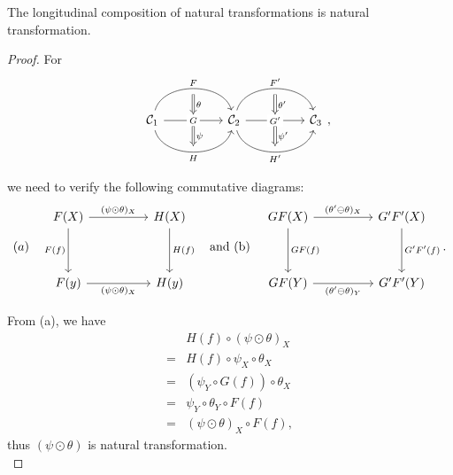 \documentclass{article}
\begin{document}
\begin{thm}
	The longitudinal composition of natural transformations is natural transformation.	
\end{thm}
\begin{proof}
	For
	\[\quad\begin{tikzcd}
		\mathcal{C}_1
		\arrow[bend left=75, rr, "F", ""' name=F] \arrow[rr, "G" description, "" name=G, ""' name=GG] \arrow[bend right=75, rr, "H"', "" name=H] & &
		\arrow[Rightarrow, from=F, to=G, "\theta"] \arrow[Rightarrow, from=GG, to=H, "\psi"]
		\mathcal{C}_2 \arrow[bend left=75, rr, "F'", ""' name=F'] \arrow[rr, "G'" description, "" name=G', ""' name=GG'] \arrow[bend right=75, rr, "H'"', "" name=H'] & &
		\arrow[Rightarrow, from=F', to=G', "\theta'"] \arrow[Rightarrow, from=GG', to=H', "\psi'"] \mathcal{C}_3
	\end{tikzcd},\]
	
	we need to verify the following commutative diagrams:
		\[(a)\quad\begin{tikzcd}
			F(X) \arrow[dd,"F(f)"'] \arrow[rr,"(\psi\odot\theta)_X"] && H(X) \arrow[dd,"H(f)"] \\ && \\
			F(y) \arrow[rr,"(\psi\odot\theta)_X"'] && H(y)
		\end{tikzcd}\quad\text{and (b)}\quad\begin{tikzcd}
			GF(X) \arrow[dd,"GF(f)"] \arrow[rr,"(\theta'\ominus\theta)_X"] && G'F'(X) \arrow[dd,"G'F'(f)"] \\ && \\
			GF(Y) \arrow[rr,"(\theta'\ominus\theta)_Y"'] && G'F'(Y)
		\end{tikzcd}.\]
		
		From (a), we have
		\begin{align}
			 & H(f)\circ(\psi\odot\theta)_X\tag{Assumption}\\
			=& H(f)\circ\psi_X\circ\theta_X\tag{Def: longitudinal composition}\\
			=& (\psi_Y\circ G(f))\circ\theta_X\tag{Property of natural transformation $\psi$}\\
			=& \psi_Y\circ\theta_Y\circ F(f)\tag{Property of natural transformation $\theta$}\\
			=& (\psi\odot\theta)_X\circ F(f),\tag{Def: longitudinal composition}
		\end{align}
		thus $(\psi\odot\theta)$ is natural transformation.\\
		

\end{proof}
\end{document}
